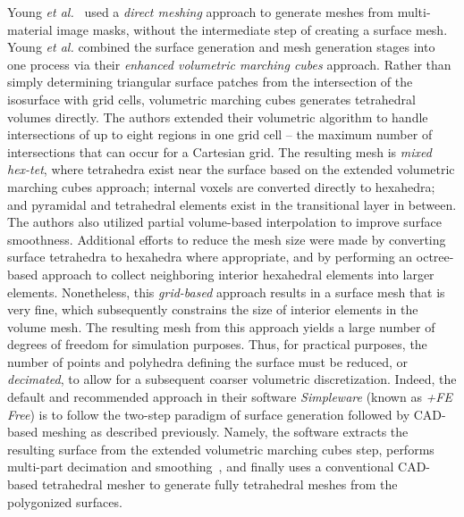  Young \textit{et al.}~\cite{young_2008} used a \textit{direct meshing} approach to generate meshes from multi-material image masks, without the intermediate step of creating a surface mesh. Young \textit{et al.} combined the surface generation and mesh generation stages into one process via their \textit{enhanced volumetric marching cubes} approach. Rather than simply determining triangular surface patches from the intersection of the isosurface with grid cells, volumetric marching cubes generates tetrahedral volumes directly. The authors extended their volumetric algorithm to handle intersections of up to eight regions in one grid cell -- the maximum number of intersections that can occur for a Cartesian grid. The resulting mesh is \textit{mixed hex-tet}, where tetrahedra exist near the surface based on the extended volumetric marching cubes approach; internal voxels are converted directly to hexahedra; and pyramidal and tetrahedral elements exist in the transitional layer in between. The authors also utilized partial volume-based interpolation to improve surface smoothness. Additional efforts to reduce the mesh size were made by converting surface tetrahedra to hexahedra where appropriate, and by performing an octree-based approach to collect neighboring interior hexahedral elements into larger elements. Nonetheless, this \textit{grid-based} approach results in a surface mesh that is very fine, which subsequently constrains the size of interior elements in the volume mesh. The resulting mesh from this approach yields a large number of degrees of freedom for simulation purposes. Thus, for practical purposes, the number of points and polyhedra defining the surface must be reduced, or \textit{decimated}, to allow for a subsequent coarser volumetric discretization. Indeed, the default and recommended approach in their software \textit{Simpleware} (known as \textit{+FE Free}) is to follow the two-step paradigm of surface generation followed by CAD-based meshing as described previously. Namely, the software extracts the resulting surface from the extended volumetric marching cubes step, performs multi-part decimation and smoothing~\cite{egst}, and finally uses a conventional CAD-based tetrahedral mesher to generate fully tetrahedral meshes from the polygonized surfaces.

